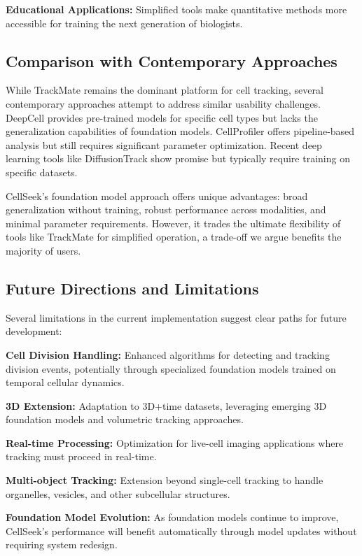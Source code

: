 \documentclass[12pt]{article}
\begin{document}
\textbf{Educational Applications:} Simplified tools make quantitative methods more accessible for training the next generation of biologists.

\subsection{Comparison with Contemporary Approaches}

While TrackMate remains the dominant platform for cell tracking, several contemporary approaches attempt to address similar usability challenges. DeepCell provides pre-trained models for specific cell types but lacks the generalization capabilities of foundation models. CellProfiler offers pipeline-based analysis but still requires significant parameter optimization. Recent deep learning tools like DiffusionTrack show promise but typically require training on specific datasets.

CellSeek's foundation model approach offers unique advantages: broad generalization without training, robust performance across modalities, and minimal parameter requirements. However, it trades the ultimate flexibility of tools like TrackMate for simplified operation, a trade-off we argue benefits the majority of users.

\subsection{Future Directions and Limitations}

Several limitations in the current implementation suggest clear paths for future development:

\textbf{Cell Division Handling:} Enhanced algorithms for detecting and tracking division events, potentially through specialized foundation models trained on temporal cellular dynamics.

\textbf{3D Extension:} Adaptation to 3D+time datasets, leveraging emerging 3D foundation models and volumetric tracking approaches.

\textbf{Real-time Processing:} Optimization for live-cell imaging applications where tracking must proceed in real-time.

\textbf{Multi-object Tracking:} Extension beyond single-cell tracking to handle organelles, vesicles, and other subcellular structures.

\textbf{Foundation Model Evolution:} As foundation models continue to improve, CellSeek's performance will benefit automatically through model updates without requiring system redesign.
\end{document}
